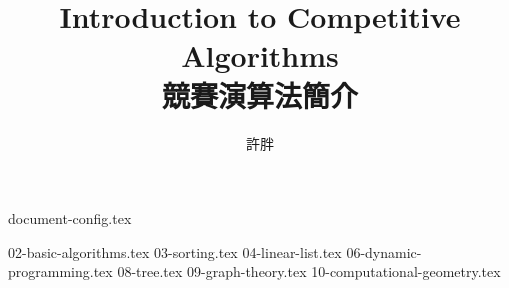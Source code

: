 \documentclass[12pt,a4paper,oneside]{book}
\begin{document}
\begin{CJK}{UTF8}{bkai}

{document-config.tex}
\title{Introduction to Competitive Algorithms\\競賽演算法簡介}
\author{許胖}
\maketitle
\tableofcontents

\setcounter{chapter}{1}
{02-basic-algorithms.tex}
{03-sorting.tex}
{04-linear-list.tex}
\setcounter{chapter}{5}
{06-dynamic-programming.tex}
\setcounter{chapter}{7}
{08-tree.tex}
{09-graph-theory.tex}
{10-computational-geometry.tex}

\printindex[noun]

\listoffigures
\clearpage
\end{CJK}
\end{document}
